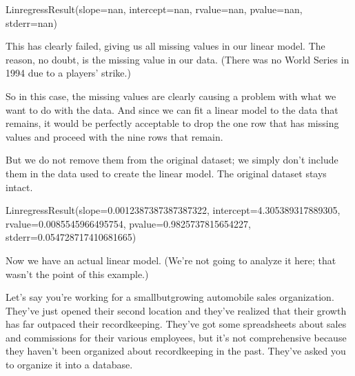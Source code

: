 \documentclass[letterpaper,10pt,english]{sphinxmanual}
\begin{document}
\begin{sphinxVerbatim}[commandchars=\\\{\}]
LinregressResult(slope=nan, intercept=nan, rvalue=nan, pvalue=nan, stderr=nan)
\end{sphinxVerbatim}

This has clearly failed, giving us all missing values in our linear model.  The reason, no doubt, is the missing value in our data.  (There was no World Series in 1994 due to a players’ strike.)

So in this case, the missing values are clearly causing a problem with what we want to do with the data.  And since we can fit a linear model to the data that remains, it would be perfectly acceptable to drop the one row that has missing values and proceed with the nine rows that remain.  

But we do not remove them from the original dataset; we simply don’t include them in the data used to create the linear model.  The original dataset stays intact.

\begin{sphinxVerbatim}[commandchars=\\\{\}]
  
 \PYG{p}{[}\PYG{p}{]} \PYG{p}{[}\PYG{p}{]} 
\end{sphinxVerbatim}

\begin{sphinxVerbatim}[commandchars=\\\{\}]
LinregressResult(slope=\PYGZhy{}0.0012387387387387322, intercept=4.305389317889305, rvalue=\PYGZhy{}0.0085545966495754, pvalue=0.9825737815654227, stderr=0.054728717410681665)
\end{sphinxVerbatim}

Now we have an actual linear model.  (We’re not going to analyze it here; that wasn’t the point of this example.)


Let’s say you’re working for a small\sphinxhyphen{}but\sphinxhyphen{}growing automobile sales organization.  They’ve just opened their second location and they’ve realized that their growth has far outpaced their record\sphinxhyphen{}keeping.  They’ve got some spreadsheets about sales and commissions for their various employees, but it’s not comprehensive because they haven’t been organized about record\sphinxhyphen{}keeping in the past.  They’ve asked you to organize it into a database.
\end{document}
